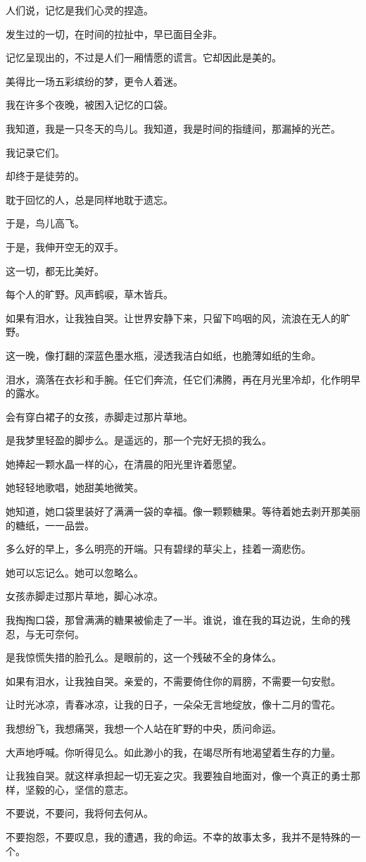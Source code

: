 		人们说，记忆是我们心灵的捏造。\par
		发生过的一切，在时间的拉扯中，早已面目全非。\par
		记忆呈现出的，不过是人们一厢情愿的谎言。它却因此是美的。\par
		美得比一场五彩缤纷的梦，更令人着迷。\par
		我在许多个夜晚，被困入记忆的口袋。\par
		我知道，我是一只冬天的鸟儿。我知道，我是时间的指缝间，那漏掉的光芒。

		我记录它们。\par
		却终于是徒劳的。\par
		耽于回忆的人，总是同样地耽于遗忘。\par
		于是，鸟儿高飞。\par
		于是，我伸开空无的双手。

		这一切，都无比美好。

	\endwriting



		每个人的旷野。风声鹤唳，草木皆兵。


		如果有泪水，让我独自哭。让世界安静下来，只留下呜咽的风，流浪在无人的旷野。\par
		这一晚，像打翻的深蓝色墨水瓶，浸透我洁白如纸，也脆薄如纸的生命。\par
		泪水，滴落在衣衫和手腕。任它们奔流，任它们沸腾，再在月光里冷却，化作明早的露水。\par
		会有穿白裙子的女孩，赤脚走过那片草地。\par
		是我梦里轻盈的脚步么。是遥远的，那一个完好无损的我么。\par
		她捧起一颗水晶一样的心，在清晨的阳光里许着愿望。\par
		她轻轻地歌唱，她甜美地微笑。\par
		她知道，她口袋里装好了满满一袋的幸福。像一颗颗糖果。等待着她去剥开那美丽的糖纸，一一品尝。\par
		多么好的早上，多么明亮的开端。只有碧绿的草尖上，挂着一滴悲伤。\par
		她可以忘记么。她可以忽略么。\par
		女孩赤脚走过那片草地，脚心冰凉。\par
		我掏掏口袋，那曾满满的糖果被偷走了一半。谁说，谁在我的耳边说，生命的残忍，与无可奈何。\par
		是我惊慌失措的脸孔么。是眼前的，这一个残破不全的身体么。

		如果有泪水，让我独自哭。亲爱的，不需要倚住你的肩膀，不需要一句安慰。\par
		让时光冰凉，青春冰凉，让我的日子，一朵朵无言地绽放，像十二月的雪花。\par
		我想纷飞，我想痛哭，我想一个人站在旷野的中央，质问命运。\par
		大声地呼喊。你听得见么。如此渺小的我，在竭尽所有地渴望着生存的力量。\par
		让我独自哭。就这样承担起一切无妄之灾。我要独自地面对，像一个真正的勇士那样，坚毅的心，坚信的意志。\par
		不要说，不要问，我将何去何从。\par
		不要抱怨，不要叹息，我的遭遇，我的命运。不幸的故事太多，我并不是特殊的一个。

